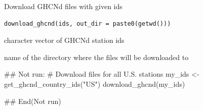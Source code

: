 %
\begin{Description}
Download GHCNd files with given ids
\end{Description}
%
\begin{Usage}
\begin{verbatim}
download_ghcnd(ids, out_dir = paste0(getwd()))
\end{verbatim}
\end{Usage}
%
\begin{Arguments}
\begin{ldescription}
\item[\code{ids}] character vector of GHCNd station ids

\item[\code{out\_dir}] name of the directory where the files will be downloaded to
\end{ldescription}
\end{Arguments}
%
\begin{Examples}
\begin{ExampleCode}
## Not run: 
# Download files for all U.S. stations
my_ids <- get_ghcnd_country_ids("US")
download_ghcnd(my_ids)

## End(Not run)
\end{ExampleCode}
\end{Examples}
